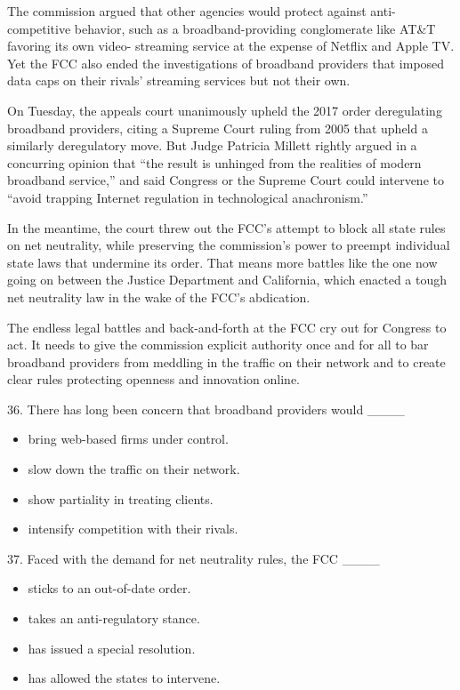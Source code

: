 \documentclass[UTF8,11pt]{ctexart}
\begin{document}
The commission argued that other agencies would protect against anti-competitive behavior, such as a broadband-providing conglomerate like AT\&T favoring its own video- streaming service at the expense of Netflix and Apple TV. Yet the FCC also ended the investigations of broadband providers that imposed data caps on their rivals’ streaming services but not their own.


On Tuesday, the appeals court unanimously upheld the 2017 order deregulating broadband providers, citing a Supreme Court ruling from 2005 that upheld a similarly deregulatory move. But Judge Patricia Millett rightly argued in a concurring opinion that “the result is unhinged from the realities of modern broadband service,” and said Congress or the Supreme Court could intervene to “avoid trapping Internet regulation in technological anachronism.”


In the meantime, the court threw out the FCC’s attempt to block all state rules on net neutrality, while preserving the commission’s power to preempt individual state laws that undermine its order. That means more battles like the one now going on between the Justice Department and California, which enacted a tough net neutrality law in the wake of the FCC’s abdication.


The endless legal battles and back-and-forth at the FCC cry out for Congress to act. It needs to give the commission explicit authority once and for all to bar broadband providers from meddling in the traffic on their network and to create clear rules protecting openness and innovation online.


36. There has long been concern that broadband providers would \_\_\_\_


\begin{itemize}[leftmargin=2em,itemsep=.2em,topsep=.4em]\item[A.] bring web-based firms under control.
\item[B.] slow down the traffic on their network.
\item[C.] show partiality in treating clients.
\item[D.] intensify competition with their rivals.
\end{itemize}

37. Faced with the demand for net neutrality rules, the FCC \_\_\_\_


\begin{itemize}[leftmargin=2em,itemsep=.2em,topsep=.4em]\item[A.] sticks to an out-of-date order.
\item[B.] takes an anti-regulatory stance.
\item[C.] has issued a special resolution.
\item[D.] has allowed the states to intervene.
\end{itemize}
\end{document}
